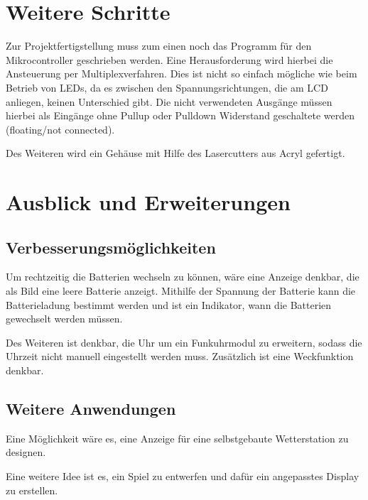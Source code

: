 \section{Weitere Schritte}

Zur Projektfertigstellung muss zum einen noch das Programm für den Mikrocontroller geschrieben werden. Eine Herausforderung wird hierbei die Ansteuerung per Multiplexverfahren. Dies ist nicht so einfach mögliche wie beim Betrieb von LEDs, da es zwischen den Spannungsrichtungen, die am LCD anliegen, keinen Unterschied gibt. Die nicht verwendeten Ausgänge müssen hierbei als Eingänge ohne Pullup oder Pulldown Widerstand geschaltete werden (floating/not connected).

Des Weiteren wird ein Gehäuse mit Hilfe des Lasercutters aus Acryl gefertigt.


\section{Ausblick und Erweiterungen}


\subsection{Verbesserungsmöglichkeiten}

Um rechtzeitig die Batterien wechseln zu können, wäre eine Anzeige denkbar, die als Bild eine leere Batterie anzeigt. Mithilfe der Spannung der Batterie kann die Batterieladung bestimmt werden und ist ein Indikator, wann die Batterien gewechselt werden müssen.

Des Weiteren ist denkbar, die Uhr um ein Funkuhrmodul zu erweitern, sodass die Uhrzeit nicht manuell eingestellt werden muss. Zusätzlich ist eine Weckfunktion denkbar.


\subsection{Weitere Anwendungen}

Eine Möglichkeit wäre es, eine Anzeige für eine selbstgebaute Wetterstation zu designen.

Eine weitere Idee ist es, ein Spiel zu entwerfen und dafür ein angepasstes Display zu erstellen.

